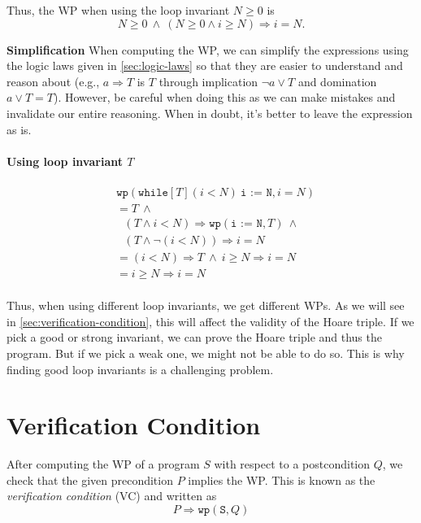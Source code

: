 \documentclass[oneside,11pt,dvipsnames]{book}
\newenvironment{commentbox}[1][]{
  \small
  \begin{mybox}
    {\small \textbf{#1}}
  }{
  \end{mybox}
}
\renewcommand{\implies}{\Rightarrow}
\newcommand{\code}[1]{\texttt{#1}}
\begin{document}
Thus, the WP when using the loop invariant $N \ge 0$ is 
\[ N \ge 0 ~\land~ (N \ge 0  \land i \ge N)  \implies i = N. \]


\begin{commentbox}{\textbf{Simplification}}
    When computing the WP, we can simplify the expressions using the logic laws given in \autoref{sec:logic-laws} so that they are easier to understand and reason about (e.g., $a \implies T$ is $T$ through implication $\neg a \lor T$ and domination $a \lor T = T$). However, be careful when doing this as we can make mistakes and invalidate our entire reasoning.  When in doubt, it's better to leave the expression as is.
\end{commentbox}


\paragraph{Using loop invariant $T$}

\begin{equation*}
    \begin{split}
        &\code{wp}(\code{while}[T] (i < N ) ~\code{i := N}, i = N)\\
    &= T ~\land  \\
    &~~~ (T \land  i < N) \implies \code{wp}(\code{i := N}, T) ~\land \\
    &~~~ (T \land \neg(i < N))  \implies i = N\\ 
    & = (i < N) \implies T ~\land~ i \ge N \implies i = N\\
    & = i \ge N \implies i = N \\
\end{split}
\end{equation*}

Thus, when using different loop invariants, we get different WPs. As we will see in \autoref{sec:verification-condition}, this will affect the validity of the Hoare triple.
If we pick a good or strong invariant, we can prove the Hoare triple and thus the program.  But if we pick a weak one, we might not be able to do so.  This is why finding good loop invariants is a challenging problem.


\section{Verification Condition}\label{sec:verification-condition} 

After computing the WP of a program $S$ with respect to a postcondition $Q$, we check that the given precondition $P$ implies the WP.  This is known as the \emph{verification condition} (VC) and written as 
\begin{equation}\label{eq:vc}
    P \implies \code{wp}(\code{S},Q)
\end{equation}
\end{document}
